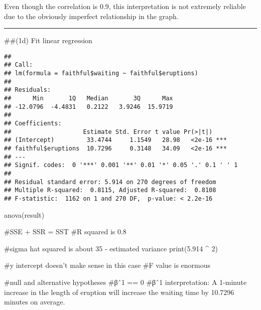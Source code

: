 \documentclass[
]{article}
\newenvironment{Shaded}{\begin{snugshade}}{\end{snugshade}}
\newcommand{\CommentTok}[1]{\textcolor[rgb]{0.56,0.35,0.01}{\textit{#1}}}
\newcommand{\KeywordTok}[1]{\textcolor[rgb]{0.13,0.29,0.53}{\textbf{#1}}}
\newcommand{\NormalTok}[1]{#1}
\newcommand{\OperatorTok}[1]{\textcolor[rgb]{0.81,0.36,0.00}{\textbf{#1}}}
\newcommand{\StringTok}[1]{\textcolor[rgb]{0.31,0.60,0.02}{#1}}
\begin{document}
\begin{Shaded}
\end{Shaded}

Even though the correlation is 0.9, this interpretation is not extremely
reliable due to the obviously imperfect relationship in the graph.

\begin{center}\rule{0.5\linewidth}{0.5pt}\end{center}

\#\#(1d) Fit linear regression

\begin{Shaded}
\end{Shaded}

\begin{verbatim}
## 
## Call:
## lm(formula = faithful$waiting ~ faithful$eruptions)
## 
## Residuals:
##      Min       1Q   Median       3Q      Max 
## -12.0796  -4.4831   0.2122   3.9246  15.9719 
## 
## Coefficients:
##                    Estimate Std. Error t value Pr(>|t|)    
## (Intercept)         33.4744     1.1549   28.98   <2e-16 ***
## faithful$eruptions  10.7296     0.3148   34.09   <2e-16 ***
## ---
## Signif. codes:  0 '***' 0.001 '**' 0.01 '*' 0.05 '.' 0.1 ' ' 1
## 
## Residual standard error: 5.914 on 270 degrees of freedom
## Multiple R-squared:  0.8115, Adjusted R-squared:  0.8108 
## F-statistic:  1162 on 1 and 270 DF,  p-value: < 2.2e-16
\end{verbatim}

anova(result)

\#SSE + SSR = SST \#R squared is 0.8

\#sigma hat squared is about 35 - estimated variance print(5.914 \^{} 2)

\#y intercept doesn't make sense in this case \#F value is enormous

\#null and alternative hypotheses \#βˆ1 == 0 \#βˆ1 interpretation: A
1-minute increase in the length of eruption will increase the waiting
time by 10.7296 minutes on average.
\end{document}
